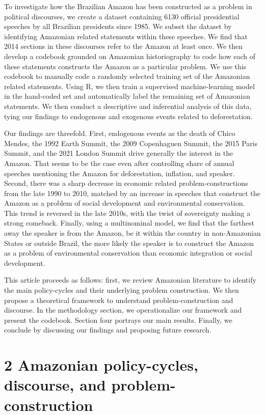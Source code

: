 \documentclass[
]{article}
\begin{document}
To investigate how the Brazilian Amazon has been constructed as a
problem in political discourses, we create a dataset containing 6130
official presidential speeches by all Brazilian presidents since 1985.
We subset the dataset by identifying Amazonian related statements within
these speeches. We find that 2014 sections in these discourses refer to
the Amazon at least once. We then develop a codebook grounded on
Amazonian historiography to code how each of these statements constructs
the Amazon as a particular problem. We use this codebook to manually
code a randomly selected training set of the Amazonian related
statements. Using R, we then train a supervised machine-learning model
in the hand-coded set and automatically label the remaining set of
Amazonian statements. We then conduct a descriptive and inferential
analysis of this data, tying our findings to endogenous and exogenous
events related to deforestation.

Our findings are threefold. First, endogenous events as the death of
Chico Mendes, the 1992 Earth Summit, the 2009 Copenhaguen Summit, the
2015 Paris Summit, and the 2021 London Summit drive generally the
interest in the Amazon. That seems to be the case even after controlling
share of annual speeches mentioning the Amazon for deforestation,
inflation, and speaker. Second, there was a sharp decrease in economic
related problem-constructions from the late 1990 to 2010, matched by an
increase in speeches that construct the Amazon as a problem of social
development and environmental conservation. This trend is reversed in
the late 2010s, with the twist of sovereignty making a strong comeback.
Finally, using a multinominal model, we find that the farthest away the
speaker is from the Amazon, be it within the country in non-Amazonian
States or outside Brazil, the more likely the speaker is to construct
the Amazon as a problem of environmental conservation than economic
integration or social development.

This article proceeds as follows: first, we review Amazonian literature
to identify the main policy-cycles and their underlying problem
construction. We then propose a theoretical framework to understand
problem-construction and discourse. In the methodology section, we
operationalize our framework and present the codebook. Section four
portrays our main results. Finally, we conclude by discussing our
findings and proposing future research.

\hypertarget{amazonian-policy-cycles-discourse-and-problem-construction}{%
\section{2 Amazonian policy-cycles, discourse, and
problem-construction}\label{amazonian-policy-cycles-discourse-and-problem-construction}}
\end{document}
